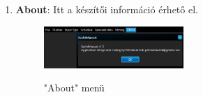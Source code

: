 \begin{enumerate}
{\begin{figure}[h!]
\begin{center}
				\label{fig:example}
			\end{center}
		\end{figure}
	}
	\item{
		\textbf{About}: Itt a készítői információ érhető el.
		\begin{figure}[h!]
			\begin{center}
				\caption{"About" menü}
				\includegraphics[width=0.5\textwidth, keepaspectratio=true]{images/img_ui_about}\\
				\label{fig:example}
			\end{center}
		\end{figure}
	}

\end{enumerate}


